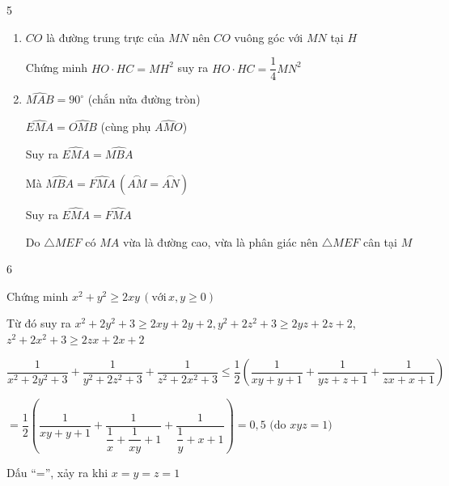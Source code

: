 \begin{Solbook}{5}
 \par \noindent  \begin {center}  \end {center} \begin {enumerate} \item $CO$ là đường trung trực của $MN$ nên $CO$ vuông góc với $MN$ tại $H$ \par Chứng minh $HO\cdot HC=MH^2 $ suy ra $ HO\cdot HC=\dfrac {1}{4}MN^2$ \item $\widehat {MAB}=90^\circ $ (chắn nửa đường tròn) \par $\widehat {EMA}=\widehat {OMB}$ (cùng phụ $\widehat {AMO}$) \par Suy ra $\widehat {EMA}=\widehat {MBA}$ \par Mà $\widehat {MBA}=\widehat {FMA} \,(\stackrel \frown {AM}=\stackrel \frown {AN})$ \par Suy ra $\widehat {EMA}=\widehat {FMA} $ \par Do $\triangle MEF$ có $MA$ vừa là đường cao, vừa là phân giác nên $\triangle MEF$ cân tại $M$ \end {enumerate}  \hfill \qedEX 
\end{Solbook}
\begin{Solbook}{6}
 \par \noindent  Chứng minh $x^2+y^2\ge 2xy\, (\text {với} \, x, y \ge 0)$ \par Từ đó suy ra $x^2+2y^2+3 \ge 2xy+2y+2, y^2 + 2z^2 + 3 \ge 2yz + 2z + 2$, $z^2 + 2x^2 + 3 \ge 2zx + 2x + 2$\\ \par $\dfrac {1}{x^2 + 2y^2 + 3} + \dfrac {1}{y^2 + 2z^2 + 3} + \dfrac {1}{z^2 + 2x^2 + 3} \le \dfrac {1}{2} \left ( \dfrac {1}{xy + y + 1} + \dfrac {1}{yz + z + 1} + \dfrac {1}{zx + x + 1} \right ) $\\ \par $= \dfrac {1}{2} \left ( \dfrac {1}{xy + y + 1} + \dfrac {1}{\dfrac {1}{x} + \dfrac {1}{xy} + 1} + \dfrac {1}{\dfrac {1}{y} + x + 1} \right ) = 0,5 \text { (do } xyz = 1 \text {)}$ \\ \par Dấu “=”, xảy ra khi $x = y = z = 1$  \hfill \qedEX 
\end{Solbook}
